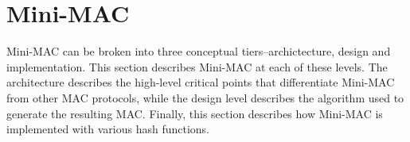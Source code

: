 \section{Mini-MAC}
\label{mini-mac}






	

Mini-MAC can be broken into three conceptual tiers--archictecture, design and implementation. This section describes Mini-MAC at each of these levels. The architecture describes the high-level critical points that differentiate Mini-MAC from other MAC protocols, while the design level describes the algorithm used to generate the resulting MAC. Finally, this section describes how Mini-MAC is implemented with various hash functions.


